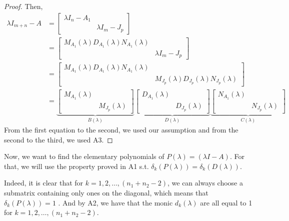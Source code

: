 \documentclass[11pt]{article}
\begin{document}
\begin{proof}
 Then, 
 \begin{align*}
 \lambda I_{m+n} - A &= \begin{bmatrix}
 \lambda I_{n} - A_1 & \\
  & \lambda I_{m} - J_p 
 \end{bmatrix}\\
 &= \begin{bmatrix}
 M_{A_1}(\lambda) D_{A_1}(\lambda) N_{A_1}(\lambda) & \\
 & \lambda I_{m} - J_p 
 \end{bmatrix}\\
  &= \begin{bmatrix}
 M_{A_1}(\lambda) D_{A_1}(\lambda) N_{A_1}(\lambda) & \\
 & M_{J_p}(\lambda) D_{J_p}(\lambda) N_{J_p}(\lambda)
 \end{bmatrix}\\
 &= \underbrace{\begin{bmatrix}
 M_{A_1}(\lambda) & \\
  & M_{J_p}(\lambda)
 \end{bmatrix}}_{B(\lambda)}\underbrace{\begin{bmatrix}
 D_{A_1}(\lambda) & \\
  & D_{J_p}(\lambda)
 \end{bmatrix}}_{D(\lambda)}\underbrace{\begin{bmatrix}
 N_{A_1}(\lambda) & \\
  & N_{J_p}(\lambda)
 \end{bmatrix}}_{C(\lambda)}
 \end{align*}
 From the first equation to the second, we used our assumption and from the second to the third, we used A3.

\end{proof}

Now, we want to find the elementary polynomials of $P(\lambda) = (\lambda I - A)$. For that, we will use the property proved in A1 s.t. $\delta_k(P(\lambda)) = \delta_k(D(\lambda))$.

Indeed, it is clear that for $k =1, 2, \dots,(n_1 + n_2 - 2)$, we can always choose a submatrix containing only ones on the diagonal, which means that $\delta_k(P(\lambda)) = 1$ . And by A2, we have that the monic $d_k(\lambda)$ are all equal to 1 for $k =1, 2, \dots, (n_1 + n_2 - 2)$. 
\end{document}
